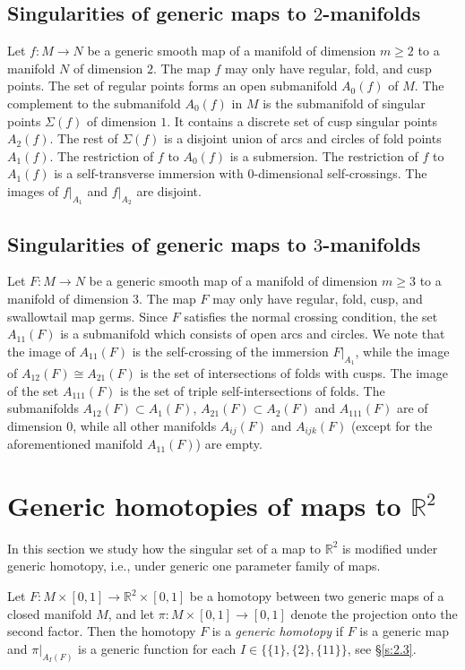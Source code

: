 \documentclass[12pt]{amsart}
\def \R{\mathbb{R}}
\def\co{\colon}
\theoremstyle{definition}
\begin{document}
\subsection{Singularities of generic maps to $2$-manifolds}
Let $f\co M\to N$ be a generic smooth map of a manifold of dimension $m\ge 2$ to a manifold $N$ of dimension $2$. The map $f$ may only have regular, fold, and cusp points. 
The set of regular points forms an open submanifold $A_0(f)$ of $M$. The complement to the submanifold $A_0(f)$ in $M$ is the submanifold of singular points $\Sigma(f)$ of dimension $1$.  It contains a discrete set of cusp singular points $A_2(f)$. The rest of $\Sigma(f)$ is a disjoint union of arcs and circles of fold points $A_1(f)$. 
The restriction of $f$ to $A_0(f)$ is a submersion. The restriction of $f$ to $A_1(f)$ 
is a self-transverse immersion with $0$-dimensional self-crossings.  The images of $f|_{A_1}$ and $f|_{A_2}$ are disjoint. 

\subsection{Singularities of generic maps to $3$-manifolds}
Let $F\co M\to N$ be a generic smooth map of a manifold of dimension $m\ge 3$ to a manifold of dimension $3$.  The map $F$ may only have regular, fold, cusp, and swallowtail map germs. 
Since $F$ satisfies the normal crossing condition, the set $A_{11}(F)$ is a submanifold which consists of open arcs and circles. We note that the image of $A_{11}(F)$ is the self-crossing of the immersion $F|_{A_1}$, while the image of $A_{12}(F)\cong A_{21}(F)$ is the set of intersections of folds with cusps. The image of the set $A_{111}(F)$ is the set of triple self-intersections of folds.  The submanifolds $A_{12}(F)\subset A_1(F)$, 
$A_{21}(F)\subset A_2(F)$ and $A_{111}(F)$ are of dimension $0$, while all other manifolds $A_{ij}(F)$ and $A_{ijk}(F)$ (except for the aforementioned manifold $A_{11}(F)$) are empty. 

\section{Generic homotopies of maps to $\R^2$}\label{s:4}
 
 In this section we study how the singular set of a map to $\R^2$ is modified under generic homotopy, i.e., under generic one parameter family of maps.

Let $F\co M\times [0,1]\to \R^2\times [0,1]$ be a homotopy between two generic maps of a closed manifold $M$, and let $\pi\co M\times [0,1]\to [0,1]$ denote the projection onto the second factor. 
Then the homotopy $F$ is a \emph{generic homotopy} if $F$ is a generic map and $\pi|_{A_I(F)}$ is a generic function for each $I\in \{\{1\}, \{2\},\{11\}\}$, see \S\ref{s:2.3}.
\end{document}
